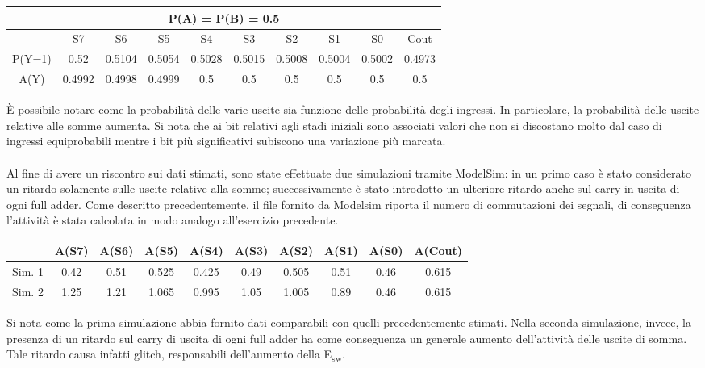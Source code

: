 \documentclass[11pt,  english, makeidx, a4paper, titlepage, oneside]{book}
\begin{document}
\vspace{0.3cm}
\begin{center}
\begin{tabular}{|c|c|c|c|c|c|c|c|c|c|}
\hline
\multicolumn{10}{c}{P(A) = P(B) = 0.5}\\
\hline
 & S7 & S6 & S5 & S4 & S3 & S2 & S1 & S0 & Cout \\
\hline
P(Y=1) & 0.52 & 0.5104 & 0.5054 & 0.5028 & 0.5015 & 0.5008 & 0.5004 & 0.5002 & 0.4973 \\
\hline
A(Y) & 0.4992 & 0.4998 & 0.4999 & 0.5 & 0.5 & 0.5 & 0.5 & 0.5 & 0.5 \\
\hline
\end{tabular}
\end{center}
\vspace{0.3cm}
È possibile notare come la probabilità delle varie uscite sia funzione delle probabilità degli ingressi.
In particolare, la probabilità delle uscite relative alle somme aumenta. Si nota che ai bit relativi agli stadi iniziali sono associati valori che non si discostano molto dal caso di ingressi equiprobabili mentre i bit più significativi subiscono una variazione più marcata.\\\\
Al fine di avere un riscontro sui dati stimati, sono state effettuate due simulazioni tramite ModelSim: in un primo caso è stato considerato un ritardo solamente sulle uscite relative alla somme; successivamente è stato introdotto un ulteriore ritardo anche sul carry in uscita di ogni full adder.
Come descritto precedentemente, il file fornito da Modelsim riporta il numero di commutazioni dei segnali, di conseguenza l'attività è stata calcolata in modo analogo all'esercizio precedente.\\
\vspace{0.3cm}
\begin{center}
\begin{tabular}{|c|c|c|c|c|c|c|c|c|c|}
\hline
 & A(S7) & A(S6) & A(S5) & A(S4) & A(S3) & A(S2) & A(S1) & A(S0) & A(Cout) \\
\hline
Sim. 1 & 0.42 & 0.51 & 0.525 & 0.425 & 0.49 & 0.505 & 0.51 & 0.46 & 0.615 \\
\hline
Sim. 2 & 1.25 & 1.21 & 1.065 & 0.995 & 1.05 & 1.005 & 0.89 & 0.46 & 0.615 \\
\hline
\end{tabular}
\end{center}
\vspace{0.3cm}
Si nota come la prima simulazione abbia fornito dati comparabili con quelli precedentemente stimati. Nella seconda simulazione, invece, la presenza di un ritardo sul carry di uscita di ogni full adder ha come conseguenza un generale aumento dell'attività delle uscite di somma. Tale ritardo causa infatti glitch, responsabili dell'aumento della E\textsubscript{sw}.
\end{document}
